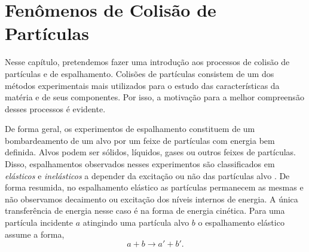 \chapter{Fenômenos de Colisão de Partículas}
Nesse capítulo, pretendemos fazer uma introdução aos processos de colisão de
partículas e de espalhamento. Colisões de partículas consistem de um dos
métodos experimentais mais utilizados para o estudo das características da
matéria e de seus componentes. Por isso, a motivação para a melhor compreensão
desses processos é evidente.

De forma geral, os experimentos de espalhamento constituem de um bombardeamento
de um alvo por um feixe de partículas com energia bem definida. Alvos podem ser
sólidos, líquidos, gases ou outros feixes de partículas. Disso, espalhamentos
observados nesses experimentos são classificados em \textit{elásticos} e
\textit{inelásticos} a depender da excitação ou não das partículas alvo
\cite{povh6ed}. De forma resumida, no espalhamento elástico as partículas
permanecem as mesmas e não observamos decaimento ou excitação dos níveis
internos de energia. A única transferência de energia nesse caso é na forma de
energia cinética. Para uma partícula incidente $a$ atingindo uma partícula alvo
$b$ o espalhamento elástico assume a forma,
\begin{equation}
	a + b \rightarrow a' + b' .
\end{equation}

